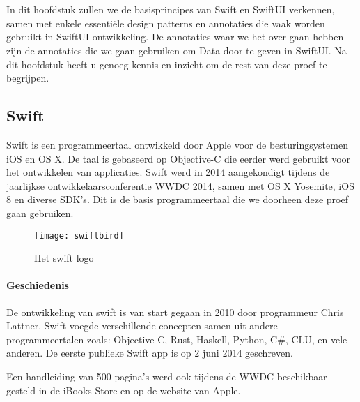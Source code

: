 \chapter{}%
\label{ch:stand-van-zaken}


In dit hoofdstuk zullen we de basisprincipes van Swift en SwiftUI verkennen, samen met enkele essentiële design patterns en annotaties die vaak worden gebruikt in SwiftUI-ontwikkeling. De annotaties waar we het over gaan hebben zijn de annotaties die we gaan gebruiken om Data door te geven in SwiftUI. Na dit hoofdstuk heeft u genoeg kennis en inzicht om de rest van deze proef te begrijpen.

\section{Swift}
\autocite{WikiSwift} Swift is een programmeertaal ontwikkeld door Apple voor de besturingsystemen iOS en OS X. De taal is gebaseerd op Objective-C die eerder werd gebruikt voor het ontwikkelen van applicaties. Swift werd in 2014 aangekondigt tijdens de jaarlijkse ontwikkelaarsconferentie WWDC 2014, samen met OS X Yosemite, iOS 8 en diverse SDK's. Dit is de basis programmeertaal die we doorheen deze proef gaan gebruiken.
\begin{figure}[htbp]
    \centering
    \texttt{[image: swiftbird]} 
    \caption{Het swift logo}
    \label{fig:swift}
\end{figure}
\subsubsection{Geschiedenis}
De ontwikkeling van swift is van start gegaan in 2010 door programmeur Chris Lattner. Swift voegde verschillende concepten samen uit andere programmeertalen zoals: Objective-C, Rust, Haskell, Python, C\#, CLU, en vele anderen. De eerste publieke Swift app is op 2 juni 2014 geschreven.

Een handleiding van 500 pagina's werd ook tijdens de WWDC beschikbaar gesteld in de iBooks Store en op de website van Apple.

